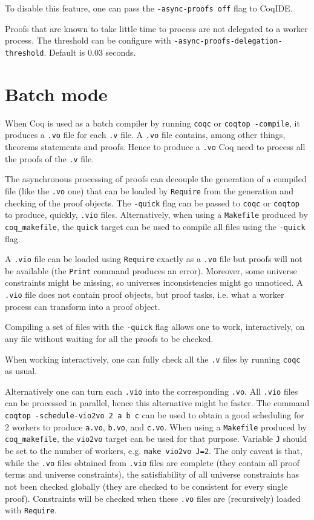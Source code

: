 To disable this feature, one can pass the \texttt{-async-proofs off} flag to
CoqIDE.

Proofs that are known to take little time to process are not delegated to a
worker process.  The threshold can be configure with \texttt{-async-proofs-delegation-threshold}.  Default is 0.03 seconds.

\section{Batch mode}

When Coq is used as a batch compiler by running \texttt{coqc} or
\texttt{coqtop -compile}, it produces a \texttt{.vo} file for each
\texttt{.v} file. A \texttt{.vo} file contains, among other things,
theorems statements and proofs. Hence to produce a \texttt{.vo} Coq need
to process all the proofs of the \texttt{.v} file.

The asynchronous processing of proofs can decouple the generation of a
compiled file (like the \texttt{.vo} one) that can be loaded by
\texttt{Require} from the generation and checking of the proof objects.
The \texttt{-quick} flag can be passed to \texttt{coqc} or
\texttt{coqtop} to produce, quickly, \texttt{.vio} files. Alternatively,
when using a \texttt{Makefile} produced by \texttt{coq\_makefile}, the
\texttt{quick} target can be used to compile all files using the
\texttt{-quick} flag.

A \texttt{.vio} file can be loaded using \texttt{Require} exactly as a
\texttt{.vo} file but proofs will not be available (the \texttt{Print}
command produces an error). Moreover, some universe constraints might be
missing, so universes inconsistencies might go unnoticed. A
\texttt{.vio} file does not contain proof objects, but proof tasks,
i.e. what a worker process can transform into a proof object.

Compiling a set of files with the \texttt{-quick} flag allows one to work,
interactively, on any file without waiting for all the proofs to be checked.

When working interactively, one can fully check all the \texttt{.v} files by
running \texttt{coqc} as usual.

Alternatively one can turn each \texttt{.vio} into the corresponding
\texttt{.vo}.  All \texttt{.vio} files can be processed in parallel,
hence this alternative might be faster. The command \texttt{coqtop
 -schedule-vio2vo 2 a b c} can be used to obtain a good scheduling for 2
workers to produce \texttt{a.vo}, \texttt{b.vo}, and \texttt{c.vo}. When
using a \texttt{Makefile} produced by \texttt{coq\_makefile}, the
\texttt{vio2vo} target can be used for that purpose.  Variable \texttt{J}
should be set to the number of workers, e.g. \texttt{make vio2vo J=2}.
The only caveat is that, while the \texttt{.vo} files obtained from
\texttt{.vio} files are complete (they contain all proof terms and
universe constraints), the satisfiability of all universe constraints has
not been checked globally (they are checked to be consistent for every
single proof). Constraints will be checked when these \texttt{.vo} files
are (recursively) loaded with \texttt{Require}.

